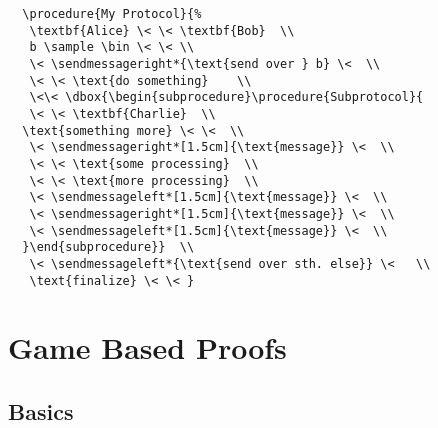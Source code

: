 \documentclass[a4paper]{report}
\begin{document}
  
  \begin{lstlisting}
  \procedure{My Protocol}{%
   \textbf{Alice} \< \< \textbf{Bob}  \\
   b \sample \bin \< \< \\
   \< \sendmessageright*{\text{send over } b} \<  \\
   \< \< \text{do something}    \\
   \<\< \dbox{\begin{subprocedure}\procedure{Subprotocol}{
   \< \< \textbf{Charlie}  \\
  \text{something more} \< \<  \\
   \< \sendmessageright*[1.5cm]{\text{message}} \<  \\
   \< \< \text{some processing}  \\
   \< \< \text{more processing}  \\ 
   \< \sendmessageleft*[1.5cm]{\text{message}} \<  \\
   \< \sendmessageright*[1.5cm]{\text{message}} \<  \\
   \< \sendmessageleft*[1.5cm]{\text{message}} \<  \\
  }\end{subprocedure}}  \\
   \< \sendmessageleft*{\text{send over sth. else}} \<   \\
   \text{finalize} \< \< }
  \end{lstlisting}
  
  
  
  
  
  
  \chapter{Game Based Proofs}
  \label{chap:gbproofs}
  
  \section{Basics}
  
\end{document}
